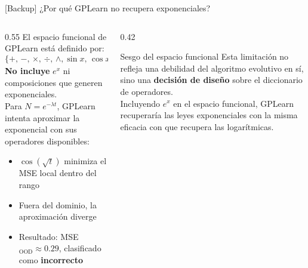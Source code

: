 \documentclass[10pt, aspectratio=169]{beamer}
\begin{document}
\begin{frame}{[Backup] ¿Por qué GPLearn no recupera exponenciales?}
  \begin{columns}[T]
    \begin{column}{0.55\textwidth}
      El espacio funcional de GPLearn está definido por:
      \[
        \{+,\,-,\,\times,\,\div,\, \wedge,  \sin x,\,\cos x,\,x^{-1},\,\sqrt{x},\,\ln x\}
      \]
      \textbf{No incluye} $e^x$ ni composiciones que generen exponenciales.\\[0.5em]
      Para $N = e^{-\lambda t}$, GPLearn intenta aproximar
      la exponencial con sus operadores disponibles:
      \begin{itemize}
        \item $\cos(\sqrt{t})$ minimiza el MSE local dentro del rango
        \item Fuera del dominio, la aproximación diverge
        \item Resultado: MSE$_\text{OOD} \approx 0.29$, clasificado
              como \textbf{incorrecto}
      \end{itemize}
    \end{column}
    \begin{column}{0.42\textwidth}
      \begin{alertblock}{Sesgo del espacio funcional}
        Esta limitación no refleja una debilidad del algoritmo
        evolutivo en sí, sino una \textbf{decisión de diseño}
        sobre el diccionario de operadores.\\[0.4em]
        Incluyendo $e^x$ en el espacio funcional, GPLearn
        recuperaría las leyes exponenciales con la misma eficacia
        con que recupera las logarítmicas.
      \end{alertblock}
    \end{column}
  \end{columns}
\end{frame}
\end{document}
